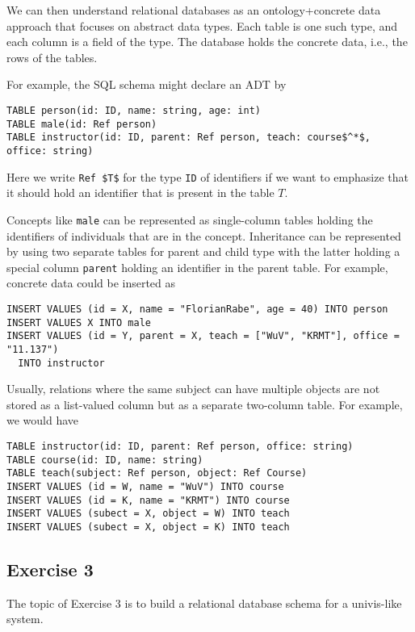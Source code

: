 We can then understand relational databases as an ontology+concrete data approach that focuses on abstract data types.
Each table is one such type, and each column is a field of the type.
The database holds the concrete data, i.e., the rows of the tables.

For example, the SQL schema might declare an ADT by
\begin{lstlisting}
TABLE person(id: ID, name: string, age: int)
TABLE male(id: Ref person)
TABLE instructor(id: ID, parent: Ref person, teach: course$^*$, office: string)
\end{lstlisting}
Here we write \lstinline|Ref $T$| for the type \lstinline|ID| of identifiers if we want to emphasize that it should hold an identifier that is present in the table $T$.

Concepts like \lstinline|male| can be represented as single-column tables holding the identifiers of individuals that are in the concept.
Inheritance can be represented by using two separate tables for parent and child type with the latter holding a special column \lstinline|parent| holding an identifier in the parent table.
For example, concrete data could be inserted as

\begin{lstlisting}
INSERT VALUES (id = X, name = "FlorianRabe", age = 40) INTO person
INSERT VALUES X INTO male
INSERT VALUES (id = Y, parent = X, teach = ["WuV", "KRMT"], office = "11.137")
  INTO instructor
\end{lstlisting}

Usually, relations where the same subject can have multiple objects are not stored as a list-valued column but as a separate two-column table.
For example, we would have
\begin{lstlisting}
TABLE instructor(id: ID, parent: Ref person, office: string)
TABLE course(id: ID, name: string)
TABLE teach(subject: Ref person, object: Ref Course)
INSERT VALUES (id = W, name = "WuV") INTO course
INSERT VALUES (id = K, name = "KRMT") INTO course
INSERT VALUES (subect = X, object = W) INTO teach
INSERT VALUES (subect = X, object = K) INTO teach
\end{lstlisting}


\subsection{Exercise 3}

The topic of Exercise 3 is to build a relational database schema for a univis-like system.

